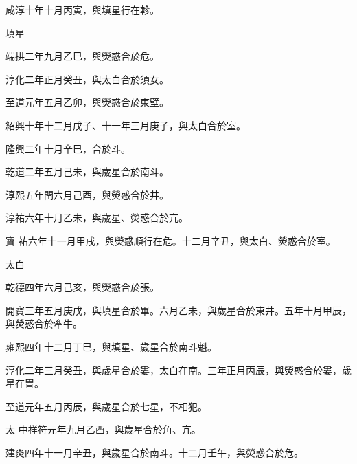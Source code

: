 \begin{pinyinscope}
 咸淳十年十月丙寅，與填星行在軫。



 填星



 端拱二年九月乙巳，與熒惑合於危。



 淳化二年正月癸丑，與太白合於須女。



 至道元年五月乙卯，與熒惑合於東壁。



 紹興十年十二月戊子、十一年三月庚子，與太白合於室。



 隆興二年十月辛巳，合於斗。



 乾道二年五月己未，與歲星合於南斗。



 淳熙五年閏六月己酉，與熒惑合於井。



 淳祐六年十月乙未，與歲星、熒惑合於亢。



 寶
 祐六年十一月甲戌，與熒惑順行在危。十二月辛丑，與太白、熒惑合於室。



 太白



 乾德四年六月己亥，與熒惑合於張。



 開寶三年五月庚戌，與填星合於畢。六月乙未，與歲星合於東井。五年十月甲辰，與熒惑合於牽牛。



 雍熙四年十二月丁巳，與填星、歲星合於南斗魁。



 淳化二年三月癸丑，與歲星合於婁，太白在南。三年正月丙辰，與熒惑合於婁，歲星在胃。



 至道元年五月丙辰，與歲星合於七星，不相犯。



 太
 中祥符元年九月乙酉，與歲星合於角、亢。



 建炎四年十一月辛丑，與歲星合於南斗。十二月壬午，與熒惑合於危。




\end{pinyinscope}
